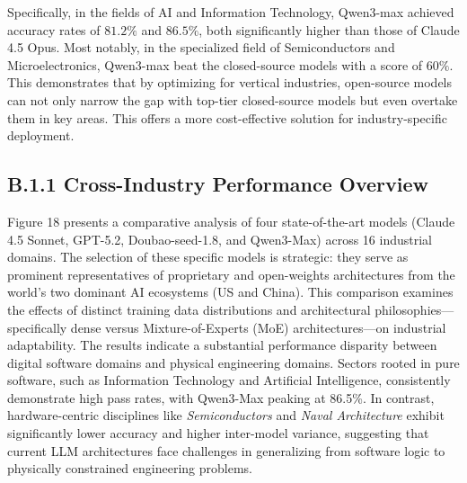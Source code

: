 \documentclass{article}
\theoremstyle{plain}
\theoremstyle{definition}
\theoremstyle{remark}
\begin{document}
Specifically, in the fields of AI and Information Technology, Qwen3-max achieved accuracy rates of $81.2\%$ and $86.5\%$, both significantly higher than those of Claude 4.5 Opus. Most notably, in the specialized field of Semiconductors and Microelectronics, Qwen3-max beat the closed-source models with a score of $60\%$. This demonstrates that by optimizing for vertical industries, open-source models can not only narrow the gap with top-tier closed-source models but even overtake them in key areas. This offers a more cost-effective solution for industry-specific deployment.






\subsection*{B.1.1 Cross-Industry Performance Overview}

Figure 18 presents a comparative analysis of four state-of-the-art models (Claude 4.5 Sonnet, GPT-5.2, Doubao-seed-1.8, and Qwen3-Max) across 16 industrial domains. The selection of these specific models is strategic: they serve as prominent representatives of proprietary and open-weights architectures from the world's two dominant AI ecosystems (US and China). This comparison examines the effects of distinct training data distributions and architectural philosophies—specifically dense versus Mixture-of-Experts (MoE) architectures—on industrial adaptability. The results indicate a substantial performance disparity between digital software domains and physical engineering domains. Sectors rooted in pure software, such as Information Technology and Artificial Intelligence, consistently demonstrate high pass rates, with Qwen3-Max peaking at 86.5\%. In contrast, hardware-centric disciplines like \textit{Semiconductors} and \textit{Naval Architecture} exhibit significantly lower accuracy and higher inter-model variance, suggesting that current LLM architectures face challenges in generalizing from software logic to physically constrained engineering problems.

\end{document}
